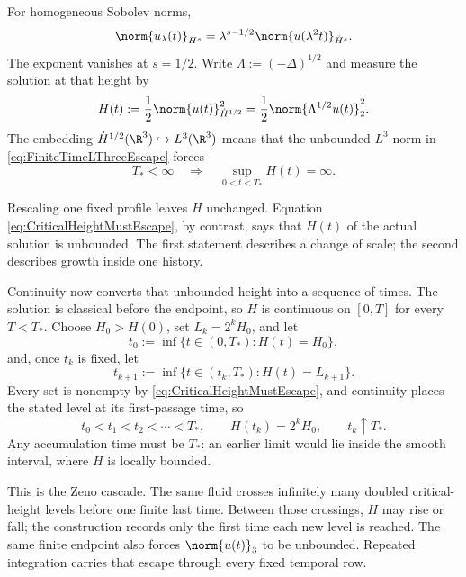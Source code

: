 For homogeneous Sobolev norms,
\[
  \norm{u_\lambda(t)}_{\dot H^s}
  =\lambda^{s-1/2}\norm{u(\lambda^2t)}_{\dot H^s}.
\]
The exponent vanishes at \(s=1/2\).
Write \(\Lambda:=(-\Delta)^{1/2}\) and measure the solution at that height by
\begin{equation}\label{eq:BodyCriticalHeightDefinition}
  H(t)
  :=\frac12\norm{u(t)}_{\dot H^{1/2}}^2
  =\frac12\norm{\Lambda^{1/2}u(t)}_2^2.
\end{equation}
The embedding \(\dot H^{1/2}(\R^3)\hookrightarrow L^3(\R^3)\) means that the unbounded \(L^3\) norm in \eqref{eq:FiniteTimeLThreeEscape} forces
\begin{equation}\label{eq:CriticalHeightMustEscape}
  T_*<\infty
  \quad\Longrightarrow\quad
  \sup_{0<t<T_*}H(t)=\infty.
\end{equation}

Rescaling one fixed profile leaves \(H\) unchanged.
Equation \eqref{eq:CriticalHeightMustEscape}, by contrast, says that \(H(t)\) of the actual solution is unbounded.
The first statement describes a change of scale; the second describes growth inside one history.

Continuity now converts that unbounded height into a sequence of times.
The solution is classical before the endpoint, so \(H\) is continuous on \([0,T]\) for every \(T<T_*\).
Choose \(H_0>H(0)\), set \(L_k=2^kH_0\), and let
\[
  t_0:=\inf\{t\in(0,T_*):H(t)=H_0\},
\]
and, once \(t_k\) is fixed, let
\[
  t_{k+1}:=\inf\{t\in(t_k,T_*):H(t)=L_{k+1}\}.
\]
Every set is nonempty by \eqref{eq:CriticalHeightMustEscape}, and continuity places the stated level at its first-passage time, so
\begin{equation}\label{eq:ZenoFirstPassageTimes}
  t_0<t_1<t_2<\cdots<T_*,
  \qquad
  H(t_k)=2^kH_0,
  \qquad
  t_k\uparrow T_*.
\end{equation}
Any accumulation time must be \(T_*\): an earlier limit would lie inside the smooth interval, where \(H\) is locally bounded.

This is the Zeno cascade.
The same fluid crosses infinitely many doubled critical-height levels before one finite last time.
Between those crossings, \(H\) may rise or fall; the construction records only the first time each new level is reached.
The same finite endpoint also forces \(\norm{u(t)}_3\) to be unbounded.
Repeated integration carries that escape through every fixed temporal row.
